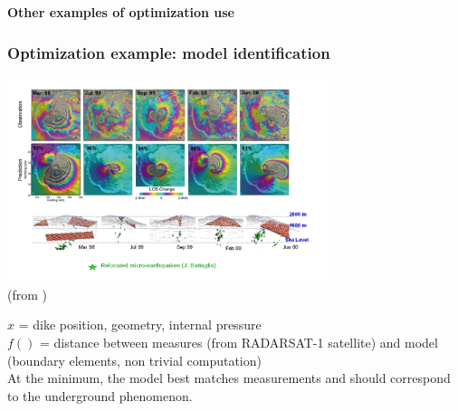 \documentclass[12pt]{beamer}
\begin{document}
\begin{frame}
\begin{center}
{ 
\textbf{
Other examples of optimization use 
} %
}%
\end{center}
\end{frame}


\begin{frame}
\frametitle{Optimization example: model identification}
\begin{center}
\includegraphics[width=0.7\textwidth]{piton_fournaise.jpg}\\
\vspace{-1cm}
{\hfill\tiny (from \cite{fukushima2010evolution})}
\end{center}
$x$ = dike position, geometry, internal pressure\\
$f()$ = distance between measures (from RADARSAT-1 satellite) and model (boundary elements, non trivial computation)\\
At the minimum, the model best matches measurements and should correspond to the underground phenomenon.
\end{frame}
\end{document}
